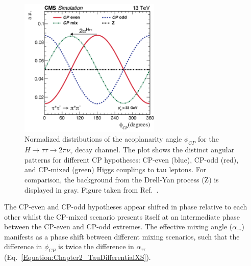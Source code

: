 \begin{figure}[h]
\centering
\includegraphics[width= 0.6\textwidth]{Figures/Chapter2/CP_Scenarios_MixingAngle.png}
\caption{Normalized distributions of the acoplanarity angle $\phi_{CP}$ for the $H \rightarrow \tau\tau \rightarrow 2\pi\nu_{\tau}$ decay channel. The plot shows the distinct angular patterns for different CP hypotheses: CP-even (blue), CP-odd (red), and CP-mixed (green) Higgs couplings to tau leptons. For comparison, the background from the Drell-Yan process (Z) is displayed in gray. Figure taken from Ref.~\cite{HiggsCP_CMS_2021}.}
\label{Figure:Chapter2_PhiCP_Gen}
\end{figure}

The CP-even and CP-odd hypotheses appear shifted in phase relative to each other whilst the CP-mixed scenario presents itself at an intermediate phase between the CP-even and CP-odd extremes. The effective mixing angle ($\alpha_{\tau\tau}$) manifests as a phase shift between different mixing scenarios, such that the difference in $\phi_{CP}$ is twice the difference in 
$\alpha_{\tau\tau}$ (Eq.~\ref{Equation:Chapter2_TauDifferentialXS}).